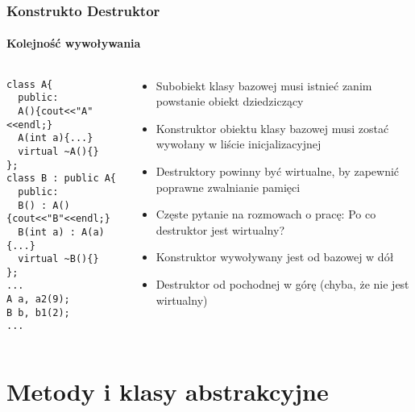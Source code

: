 \documentclass[10pt]{beamer}
\begin{document}
\begin{frame}[fragile]
  \frametitle{Konstrukto Destruktor}
  \framesubtitle{Kolejność wywoływania}
  \begin{columns}
    \begin{column}{0.49\textwidth}
      \begin{lstlisting}
class A{
  public:
  A(){cout<<"A"<<endl;}
  A(int a){...}
  virtual ~A(){}
};
class B : public A{
  public:
  B() : A() {cout<<"B"<<endl;}
  B(int a) : A(a) {...}
  virtual ~B(){}
};
...
A a, a2(9);
B b, b1(2);
...
\end{lstlisting}
    \end{column}
    \begin{column}{0.6\textwidth}
    \begin{itemize}
  \item Subobiekt klasy bazowej musi istnieć zanim powstanie obiekt dziedziczący
  \item Konstruktor obiektu klasy bazowej musi zostać wywołany w liście inicjalizacyjnej
  \item Destruktory powinny być wirtualne, by zapewnić poprawne zwalnianie pamięci
  \item Częste pytanie na rozmowach o pracę: Po co destruktor jest wirtualny?
  \item Konstruktor wywoływany jest od bazowej w dół
  \item Destruktor od pochodnej w górę (chyba, że nie jest wirtualny)
\end{itemize}
    \end{column}
  \end{columns}
\end{frame}

\section{Metody i klasy abstrakcyjne}
\end{document}
